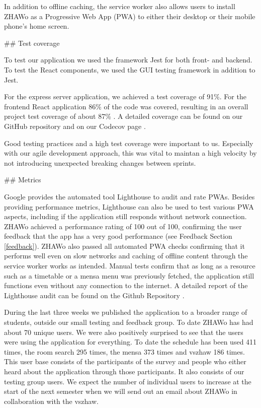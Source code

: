 \begin{markdown}
In addition to offline caching, the service worker also allows users to install ZHAWo as a Progressive Web App (PWA) \cite{WhatIsPWA} to either their desktop or their mobile phone's home screen.

\newpage

## Test coverage

To test our application we used the framework Jest \cite{Jest} for both front- and backend. To test the React components, we used the GUI testing framework \cite{Enzyme} in addition to Jest.

For the express server application, we achieved a test coverage of 91\%. For the frontend React application 86\% of the code was covered, resulting in an overall project test coverage of about 87\% \cite{OurCoverage}. A detailed coverage can be found on our GitHub repository \cite{OurGithub} and on our Codecov page \cite{OurCoverage}.

Good testing practices and a high test coverage were important to us. Especially with our agile development approach, this was vital to maintan a high velocity by not introducing unexpected breaking changes between sprints.

## Metrics

Google provides the automated tool Lighthouse \cite{Lighthouse} to audit and rate PWAs. Besides providing performance metrics, Lighthouse can also be used to test various PWA aspects, including if the application still responds without network connection. ZHAWo achieved a performance rating of 100 out of 100, confirming the user feedback that the app has a very good performance (see Feedback Section \ref{feedback}). ZHAWo also passed all automated PWA checks confirming that it performs well even on slow networks and caching of offline content through the service worker works as intended. Manual tests confirm that as long as a resource such as a timetable or a mensa menu was previously fetched, the application still functions even without any connection to the internet. A detailed report of the Lighthouse audit can be found on the Github Repository \cite{OurGithub}.

During the last three weeks we published the application to a broader range of students, outside our small testing and feedback group. To date ZHAWo has had about 70 unique users. We were also positively surprised to see that the users were using the application for everything. To date the schedule has been used 411 times, the room search 295 times, the mensa 373 times and vszhaw 186 times. This user base consists of the participants of the survey and people who either heard about the application through those participants. It also consists of our testing group users. We expect the number of individual users to increase at the start of the next semester when we will send out an email about ZHAWo in collaboration with the vszhaw.


\end{markdown}
